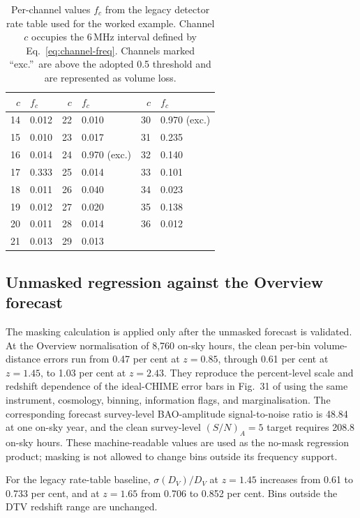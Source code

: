 \begin{table}[t]
\centering
\caption{Per-channel values $f_c$ from the legacy detector rate table used for
the worked example. Channel $c$ occupies the 6\,MHz
interval defined by Eq.~\eqref{eq:channel-freq}. Channels marked
``exc.''\ are above the adopted 0.5 threshold and are represented as
volume loss.}
\label{tab:mask}
\small
\begin{tabular}{rl|rl|rl}
\toprule
$c$ & $f_c$ & $c$ & $f_c$ & $c$ & $f_c$ \\
\midrule
14 & 0.012 & 22 & 0.010 & 30 & 0.970 (exc.) \\
15 & 0.010 & 23 & 0.017 & 31 & 0.235 \\
16 & 0.014 & 24 & 0.970 (exc.) & 32 & 0.140 \\
17 & 0.333 & 25 & 0.014 & 33 & 0.101 \\
18 & 0.011 & 26 & 0.040 & 34 & 0.023 \\
19 & 0.012 & 27 & 0.020 & 35 & 0.138 \\
20 & 0.011 & 28 & 0.014 & 36 & 0.012 \\
21 & 0.013 & 29 & 0.013 & & \\
\bottomrule
\end{tabular}
\end{table}

\subsection{Unmasked regression against the Overview forecast}
\label{sec:regression}

The masking calculation is applied only after the unmasked forecast is
validated. At the Overview normalisation of 8,760 on-sky hours, the
clean per-bin volume-distance errors run from 0.47 per cent at
$z=0.85$, through 0.61 per cent at $z=1.45$, to 1.03 per cent at
$z=2.43$. They reproduce the percent-level scale and redshift
dependence of the ideal-CHIME error bars in Fig.~31 of
\citet{CHIMEOverview2022} using the same instrument, cosmology,
binning, information flags, and marginalisation. The corresponding
forecast survey-level BAO-amplitude signal-to-noise ratio is 48.84 at
one on-sky year, and the clean survey-level $(S/N)_A=5$ target requires
208.8 on-sky hours. These machine-readable values are used as the
no-mask regression product; masking is not allowed to change bins
outside its frequency support.

For the legacy rate-table baseline, $\sigma(D_V)/D_V$ at
$z=1.45$ increases from 0.61 to 0.733 per cent, and at $z=1.65$ from
0.706 to 0.852 per cent. Bins outside the DTV redshift range are
unchanged.


